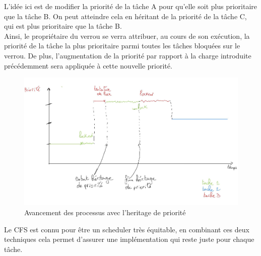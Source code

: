 \newpage


L'idée ici est de modifier la priorité de la tâche A pour qu'elle soit plus 
prioritaire que la tâche B. On peut atteindre cela en héritant de la 
priorité de la tâche C, qui est plus prioritaire que la tâche B. 
\\

Ainsi, le propriétaire du verrou se verra attribuer, au cours de son exécution, 
la priorité de la tâche la plus prioritaire parmi toutes les tâches bloquées 
sur le verrou. De plus, l'augmentation de la priorité par rapport à la charge 
introduite précédemment sera appliquée à cette nouvelle priorité.
\\

\begin{figure}[h!]
	\centering
	\includegraphics[scale=0.15]{include/with_inherit.jpg}
	\caption{Avancement des processus avec l'heritage de priorité}
	\label{fig:with_inherit}
\end{figure}


Le CFS est connu pour être un scheduler très équitable, en combinant ces deux techniques cela permet d'assurer une implémentation qui reste juste pour chaque tâche.